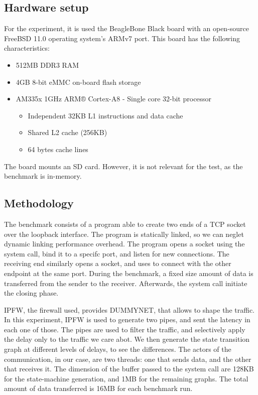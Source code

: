 \documentclass[a4paper,10pt]{article}
\begin{document}
\subsection{Hardware setup}

For the experiment, it is used the BeagleBone Black board with an open-source FreeBSD\cite{mckusick_design_2014} 11.0 operating system’s ARMv7 port. This board has the following characteristics:
\begin{itemize}
    \item 512MB DDR3 RAM
    \item 4GB 8-bit eMMC on-board flash storage
    \item AM335x 1GHz ARM® Cortex-A8 - Single core 32-bit processor\cite{noauthor_am3358_nodate}
    \begin{itemize}
        \item Independent 32KB L1 instructions and data cache
        \item Shared L2 cache (256KB)
        \item 64 bytes cache lines
    \end{itemize}
\end{itemize}

The board mounts an SD card. However, it is not relevant for the test, as the benchmark is in-memory.
      

\subsection {Methodology}

The benchmark consists of a program able to create two ends of a TCP socket over the loopback interface. The program is statically linked, so we can neglet dynamic linking performance overhead. The program opens a socket using the  system call, bind it to a specifc port, and listen for new connections. The receiving end similarly opens a socket, and uses  to connect with the other endpoint at the same port. During the benchmark, a fixed size amount of data is transferred from the sender to the receiver. Afterwards, the  system call initiate the closing phase.

IPFW\cite{IPFW}, the firewall used, provides DUMMYNET, that allows to shape the traffic. In this experiment, IPFW is used to generate two pipes, and sent the latency in each one of those. The pipes are used to filter the traffic, and selectively apply the delay only to the traffic we care abot. We then generate the state transition graph at different levels of delays, to see the differences.
The actors of the communication, in our case, are two threads: one that sends data, and the other that receives it. The dimension of the buffer passed to the  system call are 128KB for the state-machine generation, and 1MB for the remaining graphs.
The total amount of data transferred is 16MB for each benchmark run.
\end{document}

